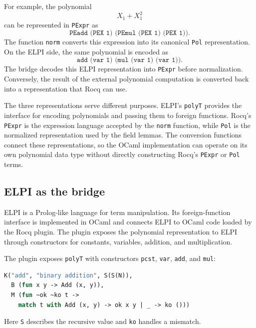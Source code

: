 \documentclass[11pt]{article}
\begin{document}
For example, the polynomial
\[
  X_1+X_1^2
\]
can be represented in \texttt{PExpr} as
\[
  \texttt{PEadd (PEX 1) (PEmul (PEX 1) (PEX 1))}.
\]
The function \texttt{norm} converts this expression into its canonical
\texttt{Pol} representation. On the ELPI side, the same polynomial is
encoded as
\[
  \texttt{add (var 1) (mul (var 1) (var 1))}.
\]
The bridge decodes this ELPI representation into \texttt{PExpr} before
normalization. Conversely, the result of the external polynomial computation
is converted back into a representation that Rocq can use.

The three representations serve different purposes. ELPI's \texttt{polyT} provides the interface for encoding polynomials and passing them to foreign functions. Rocq's \texttt{PExpr} is the expression language accepted by the \texttt{norm} function, while \texttt{Pol} is the normalized representation used by the field lemmas. The conversion functions connect these representations, so the OCaml implementation can operate on its own polynomial data type without directly constructing Rocq's \texttt{PExpr} or \texttt{Pol} terms.

\subsection{ELPI as the bridge}
ELPI is a Prolog-like language for term manipulation. Its foreign-function
interface is implemented in OCaml and connects ELPI to OCaml code loaded by the
Rocq plugin. The plugin exposes the polynomial representation to ELPI through
constructors for constants, variables, addition, and multiplication.

The plugin exposes \texttt{polyT} with constructors \texttt{pcst},
\texttt{var}, \texttt{add}, and \texttt{mul}:
\begin{lstlisting}[language=ML]
K("add", "binary addition", S(S(N)),
  B (fun x y -> Add (x, y)),
  M (fun ~ok ~ko t ->
    match t with Add (x, y) -> ok x y | _ -> ko ()))
\end{lstlisting}
Here \texttt{S} describes the recursive value and \texttt{ko} handles a
mismatch.
\end{document}
